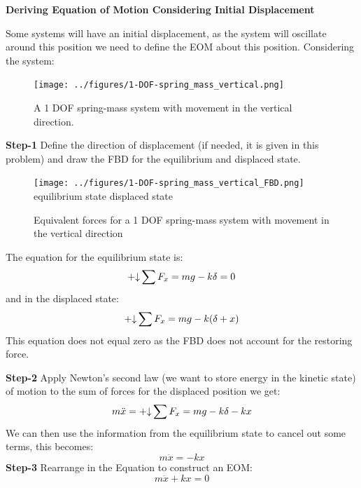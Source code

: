 \documentclass[12pt,letter]{article}
\begin{document}
		\pagebreak
		\begin{example}	

			\textbf{Deriving Equation of Motion Considering Initial Displacement}

			\noindent Some systems will have an initial displacement, as the system will oscillate around this position we need to define the EOM about this position. Considering the system:
			\begin{figure}[H]
				\centering
				\texttt{[image: ../figures/1-DOF-spring\_mass\_vertical.png]}
				\caption{A 1 DOF spring-mass system with movement in the vertical direction.}
			\end{figure}		
			\noindent \textbf{Step-1}
			Define the direction of displacement (if needed, it is given in this problem) and draw the FBD for the equilibrium and displaced state.  
			\begin{figure}[H]
				\centering
				\texttt{[image: ../figures/1-DOF-spring\_mass\_vertical\_FBD.png]}\\
				equilibrium state \hspace{3.6cm} displaced state
				\caption{Equivalent forces for a 1 DOF spring-mass system with movement in the vertical direction}
			\end{figure}		
			\noindent The equation for the equilibrium state is:
			\begin{equation}
				\mathbin{+\mathord\downarrow} \sum F_x = mg - k\delta = 0
			\end{equation}
			and in the displaced state:
			\begin{equation}
				\mathbin{+\mathord\downarrow} \sum F_x =mg -k(\delta + x)
			\end{equation}	
			This equation does not equal zero as the FBD does not account for the restoring force.	
			
			\noindent \textbf{Step-2} Apply Newton's second law (we want to store energy in the kinetic state) of motion to the sum of forces for the displaced position we get: 		
			\begin{equation}
				m\ddot{x} = \mathbin{+\mathord\downarrow} \sum F_x =mg -k\delta -kx
			\end{equation}
			We can then use the information from the equilibrium state to cancel out some terms, this becomes:
			\begin{equation}
				m\ddot{x} = -kx
			\end{equation}				
			\textbf{Step-3} Rearrange in the Equation to construct an EOM: 					
			\begin{equation}
				m\ddot{x} + kx = 0
			\end{equation}			
		\end{example}		
\end{document}
